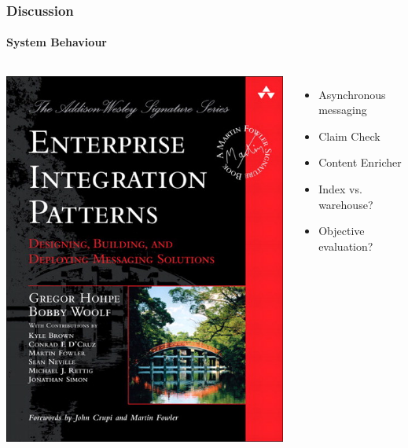 \documentclass{beamer}
\begin{document}
\begin{frame}
  \frametitle{Discussion}
  \framesubtitle{System Behaviour}
  \begin{columns}[T]
    
    
    \includegraphics[width=\linewidth]{eip.jpg}
    
    
      \begin{itemize}
      \item Asynchronous messaging
      \item Claim Check
      \item Content Enricher
      \item Index vs. warehouse?
      \item Objective evaluation?
      \end{itemize}

  \end{columns}
\end{frame}
\end{document}
